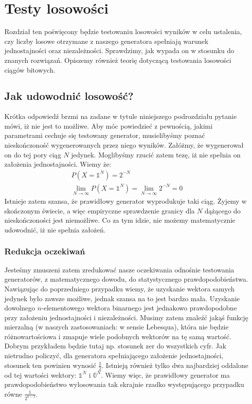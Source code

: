 \chapter{Testy losowości}
\thispagestyle{chapterBeginStyle}

Rozdział ten poświęcony będzie testowaniu losowości wyników w celu ustalenia, czy liczby losowe otrzymane z naszego generatora spełniają warunek jednostajności oraz niezależności. Sprawdzimy, jak wypada on w stosunku do znanych rozwiązań. Opiszemy również teorię dotyczącą testowania losowości ciągów bitowych.

\section{Jak udowodnić losowość?}
Krótka odpowiedź brzmi na zadane w tytule niniejszego podrozdziału pytanie mówi, iż nie jest to możliwe. Aby móc powiedzieć z pewnością, jakimi parametrami cechuje się testowany generator, musielibyśmy poznać nieskończoność wygenerowanych przez niego wyników. Załóżmy, że wygenerował on do tej pory ciąg $N$ jedynek. Moglibyśmy rzucić zatem tezę, iż nie spełnia on założenia jednostajności. Wiemy że:
\begin{equation}
\begin{gathered}
    P(X = \mathbb{1}^N) = 2^{-N}\\
    \lim_{N \to \infty} P(X = \mathbb{1}^N) = \lim_{N \to \infty} 2^{-N} = 0
\end{gathered}
\end{equation}
Istnieje zatem szansa, że prawidłowy generator wyprodukuje taki ciąg. Żyjemy w skończonym świecie, a więc empiryczne sprawdzenie granicy dla $N$ dążącego do nieskończoności jest niemożliwe. Co za tym idzie, nie możemy matematycznie udowodnić, iż nie spełnia założeń.
\subsection{Redukcja oczekiwań}
Jesteśmy zmuszeni zatem  zredukować nasze oczekiwania odnośnie testowania generatorów, z matematycznego dowodu, do statystycznego prawdopodobieństwa. Nawiązując do poprzedniego przypadku wiemy, że uzyskanie wektora samych jedynek było zawsze możliwe, jednak szansa na to jest bardzo mała. Uzyskanie dowolnego $n$-elementowego wektora binarnego jest jednakowo prawdopodobne przy założeniu jednostajności i niezależności. Musimy zatem znaleźć jakąś funkcję mierzalną (w naszych zastosowaniach: w sensie Lebesqua), która nie będzie różnowartościowa i zmapuje wiele podobnych wektorów na tę samą wartość. Dobrym przykładem  będzie tutaj  np. stosunek zer do wszystkich cyfr. Jak nietrudno policzyć, dla generatora spełniającego założenie jednostajności, stosunek ten powinien wynosić $\frac{1}{2}$. Istnieją również tylko dwa najbardziej oddalone od tej wartości wektory: $\mathbb{1}^N$ i $\mathbb{0}^N$. Wiemy więc, że prawidłowy generator ma prawdopodobieństwo wylosowania tak skrajnie rzadko występującego przypadku równe $\frac{1}{2^{n-1}}$.
